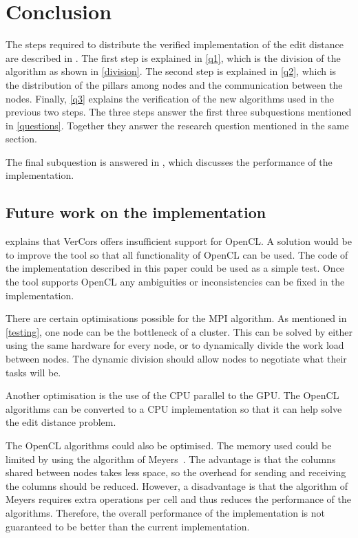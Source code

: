 \section{Conclusion}
The steps required to distribute the verified implementation of the edit distance are described in .
The first step is explained in \cref{q1}, which is the division of the algorithm as shown in \cref{division}.
The second step is explained in \cref{q2}, which is the distribution of the pillars among nodes and the communication between the nodes.
Finally, \cref{q3} explains the verification of the new algorithms used in the previous two steps.
The three steps answer the first three subquestions mentioned in \cref{questions}.
Together they answer the research question mentioned in the same section.

The final subquestion is answered in , which discusses the performance of the implementation.

\subsection{Future work on the implementation} \label{future}
 explains that VerCors offers insufficient support for OpenCL.
A solution would be to improve the tool so that all functionality of OpenCL can be used.
The code of the implementation described in this paper could be used as a simple test.
Once the tool supports OpenCL any ambiguities or inconsistencies can be fixed in the implementation.

There are certain optimisations possible for the MPI algorithm.
As mentioned in \cref{testing}, one node can be the bottleneck of a cluster.
This can be solved by either using the same hardware for every node, or to dynamically divide the work load between nodes.
The dynamic division should allow nodes to negotiate what their tasks will be.

Another optimisation is the use of the CPU parallel to the GPU.
The OpenCL algorithms can be converted to a CPU implementation so that it can help solve the edit distance problem.

The OpenCL algorithms could also be optimised.
The memory used could be limited by using the algorithm of Meyers~\cite{Meyers}.
The advantage is that the columns shared between nodes takes less space, so the overhead for sending and receiving the columns should be reduced.
However, a disadvantage is that the algorithm of Meyers requires extra operations per cell and thus reduces the performance of the algorithms.
Therefore, the overall performance of the implementation is not guaranteed to be better than the current implementation.
